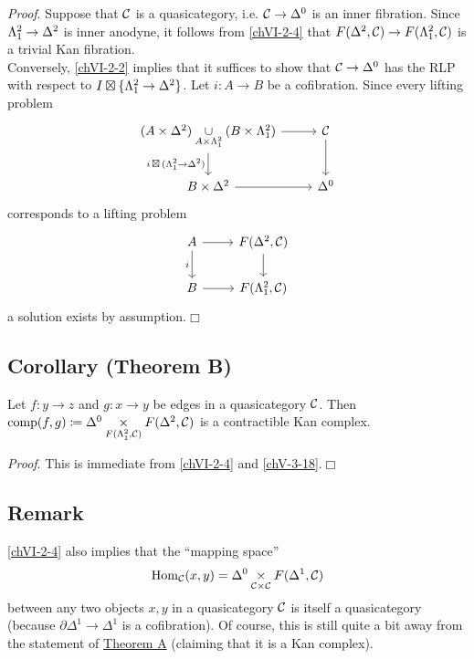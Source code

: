         \emph{Proof}. Suppose that $\mathcal{C}$ is a quasicategory, i.e. $\mathcal{C} \to \Delta^0$ is an inner fibration. Since $\Lambda^{2}_{1} \to \Delta^2$ is inner anodyne, it follows from \ref{chVI-2-4} that $F(\Delta^2, \mathcal{C}) \to F(\Lambda^{2}_{1}, \mathcal{C})$ is a trivial Kan fibration.\\
        Conversely, \ref{chVI-2-2} implies that it suffices to show that $\mathcal{C} \to \Delta^0$ has the RLP with respect to $I \boxtimes \{\Lambda^{2}_{1} \to \Delta^2\}$. Let $i \colon A \to B$ be a cofibration. Since every lifting problem
        \begin{equation*}
            \begin{tikzcd}
                (A \times \Delta^2) \underset{A \times \horn{2}{1}}{\cup} (B \times \horn{2}{1}) \arrow[d, "{i \,\boxtimes\, (\horn{2}{1} \to \Delta^2)}"'] \arrow[r] & \Cc \arrow[d] \\
                B \times \Delta^2 \arrow[r] & \Delta^0
            \end{tikzcd}
        \end{equation*}
        corresponds to a lifting problem
        \begin{equation*}
            \begin{tikzcd}
                A \arrow[d, "i"'] \arrow[r] & F(\Delta^2, \Cc) \arrow[d] \\
                B \arrow[r] & F(\horn{2}{1}, \Cc)
            \end{tikzcd}
        \end{equation*}
        a solution exists by assumption.\hfill$\Box$

    \subsection{Corollary (Theorem B)}\label{chVI-2-6}
        Let $f \colon y \to z$ and $g \colon x \to y$ be edges in a quasicategory $\mathcal{C}$. Then $\operatorname{comp}(f, g) \coloneq \Delta^0 \underset{F(\Lambda^{2}_{1}, \mathcal{C})}{\times} F(\Delta^2, \mathcal{C})$ is a contractible Kan complex.
        \smallskip

        \emph{Proof}. This is immediate from \ref{chVI-2-4} and \ref{chV-3-18}.\hfill$\Box$

    \subsection{Remark}\label{chVI-2-7}
        \ref{chVI-2-4} also implies that the ``mapping space''
        \begin{equation*}
            \operatorname{Hom}_{\mathcal{C}}(x, y) = \Delta^0 \underset{\mathcal{C} \times \mathcal{C}}{\times} F(\Delta^1, \mathcal{C})
        \end{equation*}
        between any two objects $x, y$ in a quasicategory $\mathcal{C}$ is itself a quasicategory (because $\partial \Delta^1 \to \Delta^1$ is a cofibration). Of course, this is still quite a bit away from the statement of \hyperref[chIII-4]{Theorem A} (claiming that it is a Kan complex).

